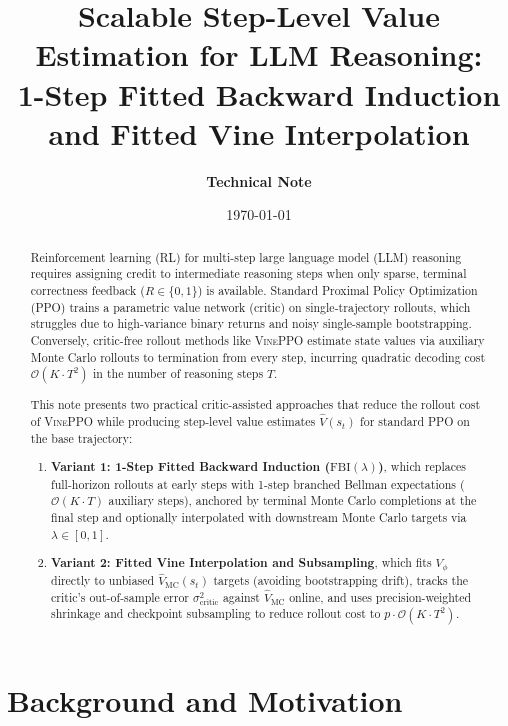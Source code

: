 \documentclass[11pt,a4paper]{article}
\title{\textbf{Scalable Step-Level Value Estimation for LLM Reasoning:\\1-Step Fitted Backward Induction and Fitted Vine Interpolation}}
\author{\textbf{Technical Note}}
\date{\today}
\newcommand{\Vmc}{\hat{V}_{\text{MC}}}
\begin{document}
\maketitle

\begin{abstract}
Reinforcement learning (RL) for multi-step large language model (LLM) reasoning requires assigning credit to intermediate reasoning steps when only sparse, terminal correctness feedback ($R \in \{0, 1\}$) is available. Standard Proximal Policy Optimization (PPO) trains a parametric value network (critic) on single-trajectory rollouts, which struggles due to high-variance binary returns and noisy single-sample bootstrapping. Conversely, critic-free rollout methods like \textsc{VinePPO} estimate state values via auxiliary Monte Carlo rollouts to termination from every step, incurring quadratic decoding cost $\mathcal{O}(K \cdot T^2)$ in the number of reasoning steps $T$.

This note presents two practical critic-assisted approaches that reduce the rollout cost of \textsc{VinePPO} while producing step-level value estimates $\hat{V}(s_t)$ for standard PPO on the base trajectory:
\begin{enumerate}
    \item \textbf{Variant 1: 1-Step Fitted Backward Induction ($\text{FBI}(\lambda)$)}, which replaces full-horizon rollouts at early steps with 1-step branched Bellman expectations ($\mathcal{O}(K \cdot T)$ auxiliary steps), anchored by terminal Monte Carlo completions at the final step and optionally interpolated with downstream Monte Carlo targets via $\lambda \in [0, 1]$.
    \item \textbf{Variant 2: Fitted Vine Interpolation and Subsampling}, which fits $V_\phi$ directly to unbiased $\Vmc(s_t)$ targets (avoiding bootstrapping drift), tracks the critic's out-of-sample error $\sigma^2_{\text{critic}}$ against $\Vmc$ online, and uses precision-weighted shrinkage and checkpoint subsampling to reduce rollout cost to $p \cdot \mathcal{O}(K \cdot T^2)$.
\end{enumerate}
\end{abstract}

\section{Background and Motivation}
\label{sec:background}
\end{document}

